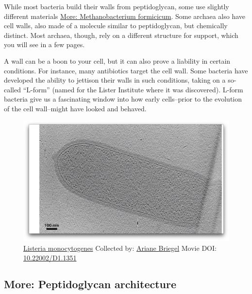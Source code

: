 \documentclass[]{tufte-book}
\begin{document}
While most bacteria build their walls from peptidoglycan, some use
slightly different materials
\protect\hyperlink{Methanobacterium_formicicum}{More: Methanobacterium
formicicum}. Some archaea also have cell walls, also made of a molecule
similar to peptidoglycan, but chemically distinct. Most archaea, though,
rely on a different structure for support, which you will see in a few
pages.

A wall can be a boon to your cell, but it can also prove a liability in
certain conditions. For instance, many antibiotics target the cell wall.
Some bacteria have developed the ability to jettison their walls in such
conditions, taking on a so-called ``L-form'' (named for the Lister
Institute where it was discovered). L-form bacteria give us a
fascinating window into how early cells--prior to the evolution of the
cell wall--might have looked and behaved.





\begin{figure}
\includegraphics{movie_stills/2_2} \caption[\protect\hyperlink{tree}{Listeria monocytogenes} Collected by:
\protect\hyperlink{ariane_briegel}{Ariane Briegel} Movie DOI:
\href{https://doi.org/10.22002/D1.1351}{10.22002/D1.1351}]{\protect\hyperlink{tree}{Listeria monocytogenes} Collected by:
\protect\hyperlink{ariane_briegel}{Ariane Briegel} Movie DOI:
\href{https://doi.org/10.22002/D1.1351}{10.22002/D1.1351}}\label{fig:2-2}
\end{figure}

\hypertarget{Peptidoglycan_architecture}{\subsection*{More:
Peptidoglycan architecture}\label{Peptidoglycan_architecture}}
\end{document}
